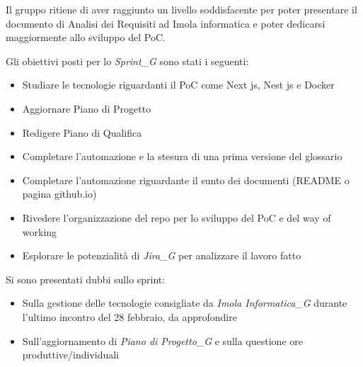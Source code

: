 Il gruppo ritiene di aver raggiunto un livello soddisfacente per poter presentare il documento di Analisi dei Requisiti ad Imola informatica e poter dedicarsi maggiormente allo sviluppo del PoC.

Gli obiettivi posti per lo \textit{Sprint_G} sono stati i seguenti:
\begin{itemize}
    \item Studiare le tecnologie riguardanti il PoC come Next js, Nest js e Docker
    \item Aggiornare Piano di Progetto
    \item Redigere Piano di Qualifica
    \item Completare l'automazione e la stesura di una prima versione del glossario
    \item Completare l'automazione riguardante il sunto dei documenti (README o pagina github.io)
    \item Rivedere l'organizzazione del repo per lo sviluppo del PoC e del way of working
    \item Esplorare le potenzialità di \textit{Jira_G} per analizzare il lavoro fatto
\end{itemize}

Si sono presentati dubbi sullo sprint:
\begin{itemize}
    \item Sulla gestione delle tecnologie consigliate da \textit{Imola Informatica_G} durante l'ultimo incontro del 28 febbraio, da approfondire
    \item Sull'aggiornamento di \textit{Piano di Progetto_G} e sulla questione ore produttive/individuali
\end{itemize}